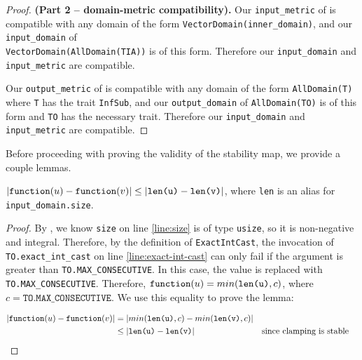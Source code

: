 \documentclass{article}
\begin{document}
\begin{proof} \textbf{(Part 2 -- domain-metric compatibility).}
    Our \texttt{input\_metric} of  is compatible with any domain of the form \texttt{VectorDomain(inner\_domain)}, 
    and our \texttt{input\_domain} of \\\texttt{VectorDomain(AllDomain(TIA))} is of this form. 
    Therefore our \texttt{input\_domain} and \texttt{input\_metric} are compatible.

    Our \texttt{output\_metric} of  is compatible with any domain of the form \texttt{AllDomain(T)} where \texttt{T} has the trait \texttt{InfSub}, 
    and our \texttt{output\_domain} of \texttt{AllDomain(TO)} is of this form and \texttt{TO} has the necessary trait.
    Therefore our \texttt{input\_domain} and \texttt{input\_metric} are compatible.
\end{proof}

Before proceeding with proving the validity of the stability map, we provide a couple lemmas.

\begin{lemma}
    \label{dsym-sens}
    $|\texttt{function}(u) - \texttt{function}(v)| \leq |\texttt{len(u)} - \texttt{len(v)}|$, 
    where \texttt{len} is an alias for \\ \texttt{input\_domain.size}.
\end{lemma}

\begin{proof}
    By , we know \texttt{size} on line \ref{line:size} is of type \texttt{usize}, 
    so it is non-negative and integral.
    Therefore, by the definition of \texttt{ExactIntCast}, 
    the invocation of \texttt{TO.exact\_int\_cast} on line \ref{line:exact-int-cast} can only fail if the argument is greater than \texttt{TO.MAX\_CONSECUTIVE}.
    In this case, the value is replaced with \texttt{TO.MAX\_CONSECUTIVE}.
    Therefore, $\texttt{function}(u) = min(\texttt{len(u)}, c)$, where $c = \texttt{TO.MAX\_CONSECUTIVE}$.
    We use this equality to prove the lemma:

    \begin{align*}
        |\texttt{function}(u) - \texttt{function}(v)| &= |min(\texttt{len(u)}, c) - min(\texttt{len(v)}, c)| \\
        &\leq |\texttt{len(u)} - \texttt{len(v)}| &&\text{since clamping is stable} \\
    \end{align*}
\end{proof}
\end{document}

